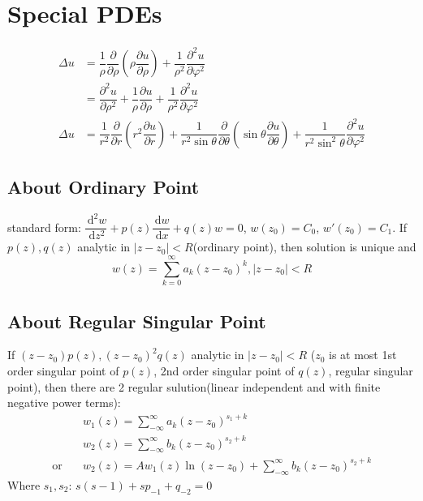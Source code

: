 \documentclass[10pt, a4paper, twocolumn]{article}
\def\D{\partial}
\def\d{\,\mathrm{d}}
\def\phi{\varphi}
\begin{document}
\section{Special PDEs}
	\begin{align*}
		\Delta u &= \dfrac{1}{\rho}\dfrac{\D}{\D\rho}
			\left(\rho\dfrac{\D u}{\D\rho}\right)
			+ \dfrac{1}{\rho^2}\dfrac{\D^2u}{\D\phi^2}\\
		&= \dfrac{\D^2u}{\D\rho^2}
			+ \dfrac{1}{\rho}\dfrac{\D u}{\D\rho}
			+ \dfrac{1}{\rho^2}\dfrac{\D^2u}{\D\phi^2}\\
		\Delta u &= \dfrac{1}{r^2}\dfrac{\D}{\D r}\left(r^2\dfrac{\D u}{\D r}\right)
			+ \dfrac{1}{r^2\sin\theta}\dfrac{\D}{\D\theta}
			\left(\sin\theta\dfrac{\D u}{\D\theta}\right)
			+ \dfrac{1}{r^2\sin^2\theta}\dfrac{\D^2u}{\D\phi^2}
	\end{align*}


\subsection{About Ordinary Point}

	standard form: $\dfrac{\d^2w}{\d z^2} + p(z)\dfrac{\d w}{\d x} + q(z)w = 0$, 
	$w(z_0)=C_0$, $w'(z_0)=C_1$. If $p(z), q(z)$ analytic in $|z-z_0|<R$(ordinary 
	point), then solution is unique and
	$$w(z) = \sum^\infty_{k=0}a_k(z-z_0)^k, |z-z_0|<R$$

\subsection{About Regular Singular Point}

	If $(z-z_0)p(z), (z-z_0)^2q(z)$ analytic in $|z-z_0|<R$ ($z_0$ is at most 1st 
	order singular point of $p(z)$, 2nd order singular point of $q(z)$, regular 
	singular point), then there are 2 regular sulution(linear independent and 
	with finite negative power terms):
	\begin{align*}
		&w_1(z) = \sum^\infty_{-\infty}a_k(z-z_0)^{s_1+k}\\
		&w_2(z) = \sum^\infty_{-\infty}b_k(z-z_0)^{s_2+k}\\
		\text{or}\quad &w_2(z) = Aw_1(z)\ln(z-z_0) + \sum^\infty_{-\infty}b_k(z-z_0)^{s_2+k}
	\end{align*}
	Where $s_1, s_2$: $s(s-1) + sp_{-1} + q_{-2} = 0 $
\end{document}
